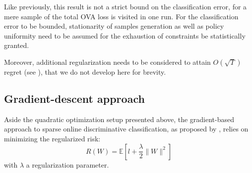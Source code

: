 \documentclass[preprint,12pt,authoryear]{elsarticle}
\begin{document}
Like previously, this result is not a strict bound on the classification error, for a mere sample of the total OVA loss is visited in one run. For the classification error to be bounded, stationarity of samples generation as well as policy uniformity need to be assumed for the exhaustion of constraints be statistically granted.  

Moreover, additional regularization needs to be considered to attain $O(\sqrt{T})$ regret (see \cite{crammer2006online}), that 
we do not develop here for brevity. 





\subsection{Gradient-descent approach}

Aside the quadratic optimization setup presented above, the gradient-based approach to sparse online discriminative classification, as proposed by \cite{kivinen2004online}, relies on minimizing the regularized risk:
$$R(W) = \mathbb{E}\left[ l + \frac{\lambda}{2}\|W\|^2\right]$$
with $\lambda$ a regularization parameter.
\end{document}

